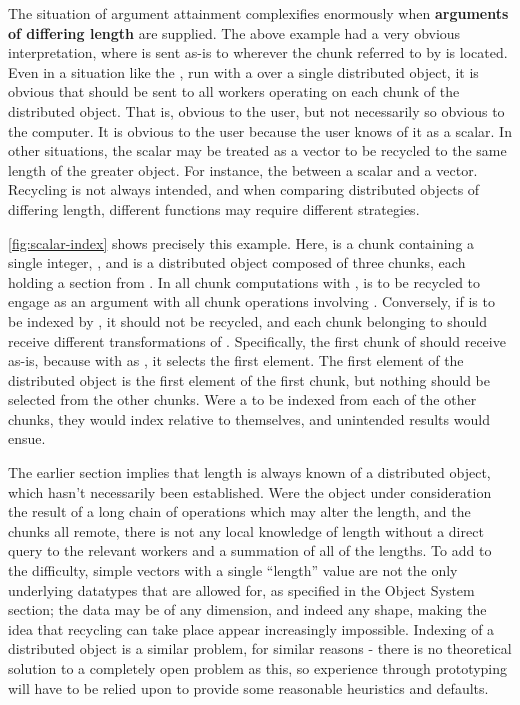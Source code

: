 The situation of argument attainment complexifies enormously when
\textbf{arguments of differing length} are supplied. The above example
had a very obvious interpretation, where  is sent as-is to
wherever the chunk referred to by  is located. Even in a
situation like the , run with a
 over a single distributed object, it is obvious that
 should be sent to all workers operating on each chunk of
the distributed object. That is, obvious to the user, but not
necessarily so obvious to the computer. It is obvious to the user
because the user knows of it as a scalar. In other situations, the
scalar may be treated as a vector to be recycled to the same length of
the greater object. For instance, the  between a scalar and
a vector. Recycling is not always intended, and when comparing
distributed objects of differing length, different functions may require
different strategies.

\cref{fig:scalar-index} shows precisely this example. Here,  is a
chunk containing a single integer, , and  is a
distributed object composed of three chunks, each holding a section from
. In all chunk computations with ,
 is to be recycled to engage as an argument with all chunk
operations involving . Conversely, if  is to be
indexed by , it should not be recycled, and each chunk
belonging to  should receive different transformations of
. Specifically, the first chunk of  should receive
 as-is, because with  as , it selects the
first element. The first element of the distributed object is the first
element of the first chunk, but nothing should be selected from the
other chunks. Were a  to be indexed from each of the other
chunks, they would index relative to themselves, and unintended results
would ensue.


The earlier section implies that length is always known of a distributed
object, which hasn't necessarily been established. Were the object under
consideration the result of a long chain of operations which may alter
the length, and the chunks all remote, there is not any local knowledge
of length without a direct query to the relevant workers and a summation
of all of the lengths. To add to the difficulty, simple vectors with a
single ``length'' value are not the only underlying datatypes that are
allowed for, as specified in the Object System section; the data may be
of any dimension, and indeed any shape, making the idea that recycling
can take place appear increasingly impossible. Indexing of a distributed
object is a similar problem, for similar reasons - there is no
theoretical solution to a completely open problem as this, so experience
through prototyping will have to be relied upon to provide some
reasonable heuristics and defaults.

